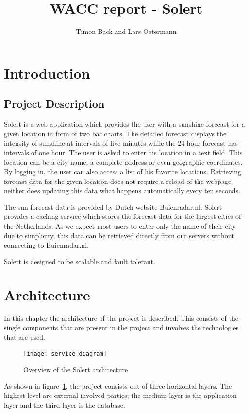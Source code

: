 \documentclass[a4paper]{article}
\title{WACC report - Solert}
\author{Timon Back and Lars Oetermann}
\begin{document}
\maketitle

\section{Introduction}

\subsection{Project Description}\label{sec:intro:description}
Solert is a web-application which provides the user with a sunshine forecast for a given location in form of two bar charts. The detailed forecast displays the intensity of sunshine at intervals of five minutes while the 24-hour forecast has intervals of one hour. The user is asked to enter his location in a text field. This location can be a city name, a complete address or even geographic coordinates. By logging in, the user can also access a list of his favorite locations. Retrieving forecast data for the given location does not require a reload of the webpage, neither does updating this data what happens automatically every ten seconds.

The sun forecast data is provided by Dutch website Buienradar.nl. Solert provides a caching service which stores the forecast data for the largest cities of the Netherlands. As we expect most users to enter only the name of their city due to simplicity, this data can be retrieved directly from our servers without connecting to Buienradar.nl.

Solert is designed to be scalable and fault tolerant.

\section{Architecture}
In this chapter the architecture of the project is described. This consists of the single components that are present in the project and involves the technologies that are used.

\begin{figure}[ht]
	\centering
	\texttt{[image: service\_diagram]}
	\caption{Overview of the Solert architecture}
	\label{fig:architecture}
\end{figure}

As shown in figure~\ref{fig:architecture}, the project consists out of three horizontal layers. The highest level are external involved parties; the medium layer is the application layer and the third layer is the database.
\end{document}
